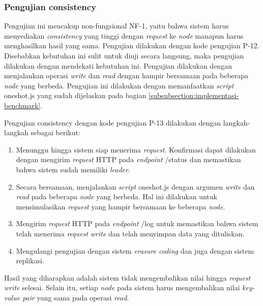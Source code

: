 \subsubsection{Pengujian consistency}
\label{subsubsection:pengujian-consistency}

Pengujian ini mencakup non-fungsional NF-1, yaitu bahwa sistem harus menyediakan \textit{consistency} yang tinggi dengan \textit{request} ke \textit{node} manapun harus menghasilkan hasil yang sama. Pengujian dilakukan dengan kode pengujian P-12. Disebabkan kebutuhan ini sulit untuk diuji secara langsung, maka pengujian dilakukan dengan mendekati kebutuhan ini. Pengujian dilakukan dengan menjalankan operasi \textit{write} dan \textit{read} dengan hampir bersamaan pada beberapa \textit{node} yang berbeda. Pengujian ini dilakukan dengan memanfaatkan \textit{script} oneshot.js yang sudah dijelaskan pada bagian \ref{subsubsection:implementasi-benchmark}.

Pengujian consistency dengan kode pengujian P-13 dilakukan dengan langkah-langkah sebagai berikut:
\begin{enumerate}
    \item Menunggu hingga sistem siap menerima \textit{request}. Konfirmasi dapat dilakukan dengan mengirim \textit{request} HTTP pada \textit{endpoint} /status dan memastikan bahwa sistem sudah memiliki \textit{leader}.
    \item Secara bersamaan, menjalankan \textit{script} oneshot.js dengan argumen \textit{write} dan \textit{read} pada beberapa \textit{node} yang berbeda. Hal ini dilakukan untuk mensimulasikan \textit{request} yang hampir bersamaan ke beberapa \textit{node}.
    \item Mengirim \textit{request} HTTP pada \textit{endpoint} /log untuk memastikan bahwa sistem telah menerima \textit{request} \textit{write} dan telah menyimpan data yang dituliskan.
    \item Mengulangi pengujian dengan sistem \textit{erasure coding} dan juga dengan sistem replikasi.
\end{enumerate}

Hasil yang diharapkan adalah sistem tidak mengembalikan nilai hingga \textit{request} \textit{write} selesai. Selain itu, setiap \textit{node} pada sistem harus mengembalikan nilai \textit{key-value pair} yang sama pada operasi \textit{read}.
